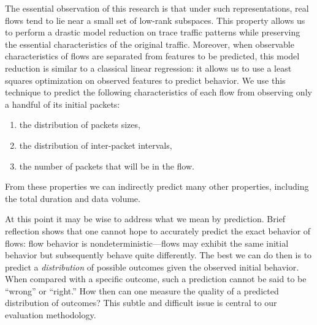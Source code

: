 \documentclass[conference]{IEEEtran}
\begin{document}
The essential observation of this research is that under such representations, real flows tend to lie near a small set of low-rank subspaces.
This property allows us to perform a drastic model reduction on trace traffic patterns while preserving the essential characteristics of the original traffic.
Moreover, when observable characteristics of flows are separated from features to be predicted, this model reduction is similar to a classical linear regression:
it allows us to use a least squares optimization on observed features to predict behavior.
We use this technique to predict the following characteristics of each flow from observing only a handful of its initial packets:
\begin{enumerate}
  \item the distribution of packets sizes,
  \item the distribution of inter-packet intervals,
  \item the number of packets that will be in the flow.
\end{enumerate}
From these properties we can indirectly predict many other properties, including the total duration and data volume.

At this point it may be wise to address what we mean by prediction.
Brief reflection shows that one cannot hope to accurately predict the exact behavior of flows:
flow behavior is nondeterministic---flows may exhibit the same initial behavior but subsequently behave quite differently.
The best we can do then is to predict a \emph{distribution} of possible outcomes given the observed initial behavior.
When compared with a specific outcome, such a prediction cannot be said to be ``wrong'' or ``right.''
How then can one measure the quality of a predicted distribution of outcomes?
This subtle and difficult issue is central to our evaluation methodology.


\end{document}
